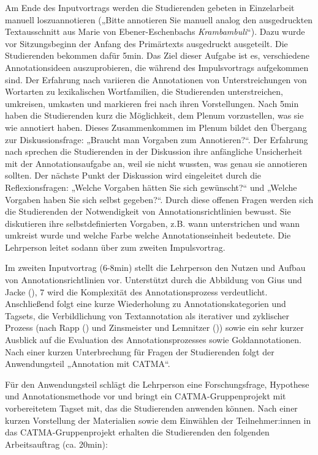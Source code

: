 \documentclass[
          a4paper,
        ]{article}
\begin{document}
Am Ende des Inputvortrags werden die Studierenden gebeten in
Einzelarbeit manuell loszuannotieren („Bitte annotieren Sie manuell
analog den ausgedruckten Textausschnitt aus Marie von Ebener-Eschenbachs
\emph{Krambambuli}``). Dazu wurde vor Sitzungsbeginn der Anfang des
Primärtexts ausgedruckt ausgeteilt. Die Studierenden bekommen dafür
5min. Das Ziel dieser Aufgabe ist es, verschiedene Annotationsideen
auszuprobieren, die während des Impulsvortrags aufgekommen sind. Der
Erfahrung nach variieren die Annotationen von Unterstreichungen von
Wortarten zu lexikalischen Wortfamilien, die Studierenden
unterstreichen, umkreisen, umkasten und markieren frei nach ihren
Vorstellungen. Nach 5min haben die Studierenden kurz die Möglichkeit,
dem Plenum vorzustellen, was sie wie annotiert haben. Dieses
Zusammenkommen im Plenum bildet den Übergang zur Diskussionsfrage:
„Braucht man Vorgaben zum Annotieren?``. Der Erfahrung nach sprechen die
Studierenden in der Diskussion ihre anfängliche Unsicherheit mit der
Annotationsaufgabe an, weil sie nicht wussten, was genau sie annotieren
sollten. Der nächste Punkt der Diskussion wird eingeleitet durch die
Reflexionsfragen: „Welche Vorgaben hätten Sie sich gewünscht?`` und
„Welche Vorgaben haben Sie sich selbst gegeben?``. Durch diese offenen
Fragen werden sich die Studierenden der Notwendigkeit von
Annotationsrichtlinien bewusst. Sie diskutieren ihre selbstdefinierten
Vorgaben, z.B. wann unterstrichen und wann umkreist wurde und welche
Farbe welche Annotationseinheit bedeutete. Die Lehrperson leitet sodann
über zum zweiten Impulsvortrag.

Im zweiten Inputvortrag (6-8min) stellt die Lehrperson den Nutzen und
Aufbau von Annotationsrichtlinien vor. Unterstützt durch die Abbildung
von Gius und Jacke (), 7 wird die
Komplexität des Annotationsprozess verdeutlicht. Anschließend folgt eine
kurze Wiederholung zu Annotationskategorien und Tagsets, die
Verbildlichung von Textannotation als iterativer und zyklischer Prozess
(nach Rapp () und Zinsmeister und
Lemnitzer ())
sowie ein sehr kurzer Ausblick auf die Evaluation des
Annotationsprozesses sowie Goldannotationen. Nach einer kurzen
Unterbrechung für Fragen der Studierenden folgt der Anwendungsteil
„Annotation mit CATMA``.

Für den Anwendungsteil schlägt die Lehrperson eine Forschungsfrage,
Hypothese und Annotationsmethode vor und bringt ein CATMA-Gruppenprojekt
mit vorbereitetem Tagset mit, das die Studierenden anwenden können. Nach
einer kurzen Vorstellung der Materialien sowie dem Einwählen der
Teilnehmer:innen in das CATMA-Gruppenprojekt erhalten die Studierenden
den folgenden Arbeitsauftrag (ca. 20min):
\end{document}
